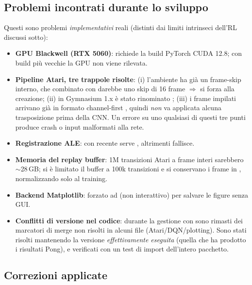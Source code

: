 \subsection{Problemi incontrati durante lo sviluppo}
\label{sec:lessons-problems}
Questi sono problemi \emph{implementativi} reali (distinti dai limiti
intrinseci dell'RL discussi sotto):
\begin{itemize}[nosep]
  \item \textbf{GPU Blackwell (RTX 5060)}: richiede la build PyTorch CUDA 12.8;
        con build pi\`u vecchie la GPU non viene rilevata.
  \item \textbf{Pipeline Atari, tre trappole risolte}: (i) l'ambiente
         ha gi\`a un frame-skip interno, che combinato con
         darebbe uno skip di 16 frame $\Rightarrow$ si
        forza  alla creazione; (ii) in Gymnasium 1.x
         \`e stato rinominato ;
        (iii) i frame impilati arrivano gi\`a in formato channel-first
        , quindi \emph{non} va applicata alcuna trasposizione
        prima della CNN. Un errore su uno qualsiasi di questi tre punti produce
        crash o input malformati alla rete.
  \item \textbf{Registrazione ALE}: con  recente serve
        , altrimenti 
        fallisce.
  \item \textbf{Memoria del replay buffer}: 1M transizioni Atari a frame interi
        sarebbero $\sim$28\,GB; si \`e limitato il buffer a 100k transizioni e si
        conservano i frame in , normalizzando solo al training.
  \item \textbf{Backend Matplotlib}: forzato ad  (non interattivo) per
        salvare le figure senza GUI.
  \item \textbf{Conflitti di versione nel codice}: durante la gestione con
         sono rimasti dei marcatori di merge non risolti in alcuni file
        (Atari/DQN/plotting). Sono stati risolti mantenendo la versione
        \emph{effettivamente eseguita} (quella che ha prodotto i risultati Pong),
        e verificati con un test di import dell'intero pacchetto.
\end{itemize}

\subsection{Correzioni applicate}
\label{sec:lessons-fixes}
